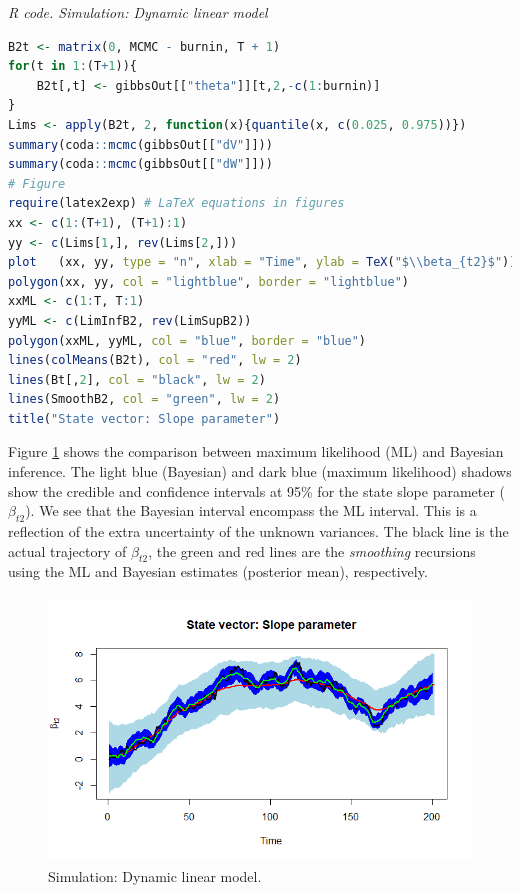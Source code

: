 \begin{tcolorbox}[enhanced,width=4.67in,center upper,
	fontupper=\large\bfseries,drop shadow southwest,sharp corners]
	\textit{R code. Simulation: Dynamic linear model}
	\begin{VF}
		\begin{lstlisting}[language=R]
B2t <- matrix(0, MCMC - burnin, T + 1)
for(t in 1:(T+1)){
	B2t[,t] <- gibbsOut[["theta"]][t,2,-c(1:burnin)] 
}
Lims <- apply(B2t, 2, function(x){quantile(x, c(0.025, 0.975))})
summary(coda::mcmc(gibbsOut[["dV"]]))
summary(coda::mcmc(gibbsOut[["dW"]]))
# Figure
require(latex2exp) # LaTeX equations in figures
xx <- c(1:(T+1), (T+1):1)
yy <- c(Lims[1,], rev(Lims[2,]))
plot   (xx, yy, type = "n", xlab = "Time", ylab = TeX("$\\beta_{t2}$"))
polygon(xx, yy, col = "lightblue", border = "lightblue")
xxML <- c(1:T, T:1)
yyML <- c(LimInfB2, rev(LimSupB2))
polygon(xxML, yyML, col = "blue", border = "blue")
lines(colMeans(B2t), col = "red", lw = 2)
lines(Bt[,2], col = "black", lw = 2)
lines(SmoothB2, col = "green", lw = 2)
title("State vector: Slope parameter")
\end{lstlisting}
	\end{VF}
\end{tcolorbox}

Figure \ref{fig1} shows the comparison between maximum likelihood (ML) and Bayesian inference. The light blue (Bayesian) and dark blue (maximum likelihood) shadows show the credible and confidence intervals at 95\% for the state slope parameter ($\beta_{t2}$). We see that the Bayesian interval encompass the ML interval. This is a reflection of the extra uncertainty of the unknown variances. The black line is the actual trajectory of $\beta_{t2}$, the green and red lines are the \textit{smoothing} recursions using the ML and Bayesian estimates (posterior mean), respectively.\\ 

\begin{figure}[!h]
	\includegraphics[width=340pt, height=200pt]{Chapters/chapter8/figures/SimSSreg.png}
	\caption[List of figure caption goes here]{Simulation: Dynamic linear model.}\label{fig1}
\end{figure} 


